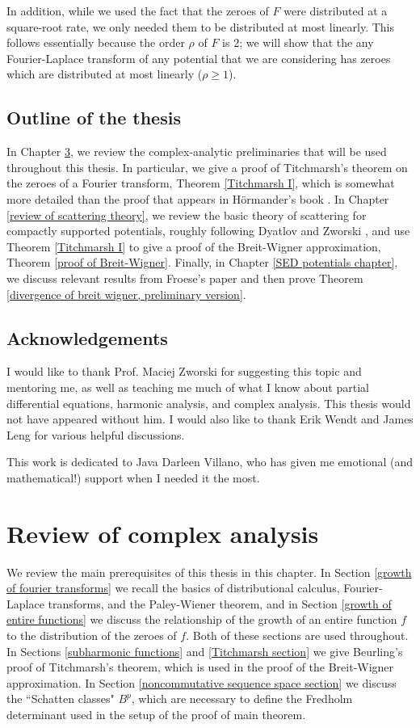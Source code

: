 \documentclass[12pt]{report}
\theoremstyle{definition}
\begin{document}
In addition, while we used the fact that the zeroes of $F$ were distributed at a square-root rate, we only needed them to be distributed at most linearly. This follows essentially because the order $\rho$ of $F$ is $2$; we will show that the any Fourier-Laplace transform of any potential that we are considering has zeroes which are distributed at most linearly ($\rho \geq 1$).

\section{Outline of the thesis}
In Chapter \ref{review of complex analysis}, we review the complex-analytic preliminaries that will be used throughout this thesis.
In particular, we give a proof of Titchmarsh's theorem on the zeroes of a Fourier transform, Theorem \ref{Titchmarsh I}, which is somewhat more detailed than the proof that appears in H\"ormander's book \cite{hormander2004analysis}.
In Chapter \ref{review of scattering theory}, we review the basic theory of scattering for compactly supported potentials, roughly following Dyatlov and Zworski \cite{dyatlov2019mathematical}, and use Theorem \ref{Titchmarsh I} to give a proof of the Breit-Wigner approximation, Theorem \ref{proof of Breit-Wigner}.
Finally, in Chapter \ref{SED potentials chapter}, we discuss relevant results from Froese's paper \cite{froese1997asymptotic} and then prove Theorem \ref{divergence of breit wigner, preliminary version}.


\section{Acknowledgements}
I would like to thank Prof. Maciej Zworski for suggesting this topic and mentoring me, as well as teaching me much of what I know about partial differential equations, harmonic analysis, and complex analysis. This thesis would not have appeared without him.
I would also like to thank Erik Wendt and James Leng for various helpful discussions.

This work is dedicated to Java Darleen Villano, who has given me emotional (and mathematical!) support when I needed it the most.


\chapter{Review of complex analysis}
\label{review of complex analysis}
We review the main prerequisites of this thesis in this chapter.
In Section \ref{growth of fourier transforms} we recall the basics of distributional calculus, Fourier-Laplace transforms, and the Paley-Wiener theorem, and in Section \ref{growth of entire functions} we discuss the relationship of the growth of an entire function $f$ to the distribution of the zeroes of $f$. Both of these sections are used throughout.
In Sections \ref{subharmonic functions} and \ref{Titchmarsh section} we give Beurling's proof of Titchmarsh's theorem, which is used in the proof of the Breit-Wigner approximation.
In Section \ref{noncommutative sequence space section} we discuss the ``Schatten classes" $B^p$, which are necessary to define the Fredholm determinant used in the setup of the proof of main theorem.
\end{document}
